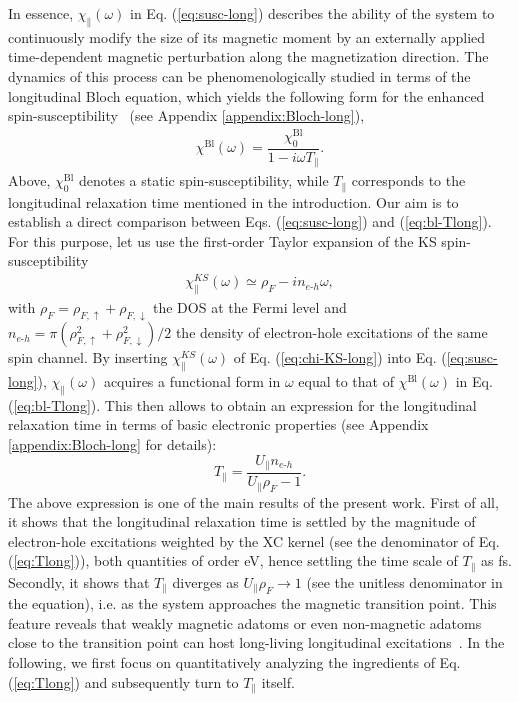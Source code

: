 \documentclass[prb,footinbib,showpacs,twocolumn,amsmath,amssymb]{revtex4}
\newcommand{\bek}{\begin{eqnarray}}
\newcommand{\ek}{\end{eqnarray}}
\begin{document}
In essence,
$\chi_{\parallel}(\omega)$ in Eq. (\ref{eq:susc-long}) describes the ability of the system
to continuously modify the size of its magnetic moment by an externally applied
time-dependent magnetic perturbation along the magnetization direction.
The dynamics of this process can be 
phenomenologically studied in terms of the longitudinal Bloch equation, 
which yields the following form for the enhanced spin-susceptibility~\cite{white_quantum_2007}
(see Appendix \ref{appendix:Bloch-long}),
\bek\label{eq:bl-Tlong}
\chi^{\text{Bl}}(\omega) =
\dfrac{\chi^{\text{Bl}}_{0}}{1-i\omega T_{\parallel}}.
\ek
Above, $\chi^{\text{Bl}}_{0}$ denotes a static spin-susceptibility, while 
$T_{\parallel}$ corresponds to the longitudinal relaxation time mentioned in the introduction. 
Our aim is to establish a direct comparison between 
Eqs. (\ref{eq:susc-long}) and (\ref{eq:bl-Tlong}). For this purpose, let us
use the first-order Taylor expansion of the KS spin-susceptibility~\cite{PhysRevLett.119.017203} 
\bek\label{eq:chi-KS-long}
\chi^{KS}_{\parallel}(\omega)\simeq \rho_{F}   
-in_{e\text{-}h}\omega,
\ek
with  $\rho_{F}=\rho_{F,\uparrow}+\rho_{F,\downarrow}$ the DOS at the Fermi level
and $n_{e\text{-}h}=\pi(\rho^{2}_{F,\uparrow}+\rho^{2}_{F,\downarrow})/2$ the density of electron-hole
excitations of the same spin channel.
By inserting $\chi^{KS}_{\parallel}(\omega)$ of Eq. (\ref{eq:chi-KS-long})
into Eq. (\ref{eq:susc-long}),
$\chi_{\parallel}(\omega)$ acquires a functional form in $\omega$
equal to that of $\chi^{\text{Bl}}(\omega)$ in Eq. (\ref{eq:bl-Tlong}). This then allows to obtain an 
expression for the longitudinal relaxation time in terms of
basic electronic properties  
(see Appendix \ref{appendix:Bloch-long} for details):
\begin{equation}
\label{eq:Tlong}
T_{\parallel}=
\dfrac{U_{\parallel}n_{e\text{-}h}}{U_{\parallel}\rho_{F}-1}.
\end{equation}
The above expression is one of the main results of the present work. 
First of all, it shows that the longitudinal relaxation time is 
settled by the magnitude of electron-hole excitations weighted by
the XC kernel (see the denominator of Eq. (\ref{eq:Tlong})),
both quantities of order eV, hence settling the time scale of 
$T_{\parallel}$ as fs.
Secondly, it shows that $T_{\parallel}$ diverges as 
$U_{\parallel}\rho_{F}\rightarrow 1$ (see the unitless denominator
in the equation),
i.e. as the system approaches the magnetic transition point.
This feature reveals that weakly magnetic adatoms or even non-magnetic
adatoms close to the transition point can host long-living 
longitudinal excitations~\cite{PhysRevLett.119.017203}.
In the following,
we first focus on quantitatively 
analyzing the ingredients of Eq. (\ref{eq:Tlong})
and subsequently turn to $T_{\parallel}$ itself.
\end{document}
